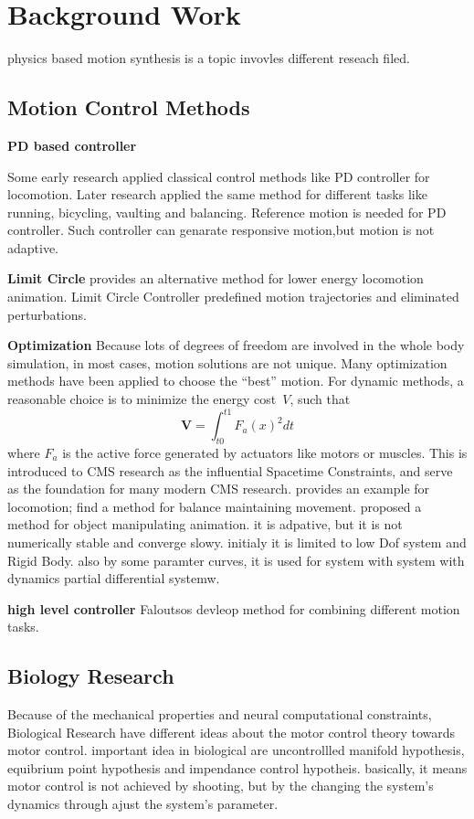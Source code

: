 \section{Background Work}
physics based motion synthesis is a topic invovles different reseach filed.
\subsection{Motion Control Methods}
\textbf{PD based controller}


Some early research applied classical control methods like PD controller \cite{Raibert1991} for locomotion. 
Later research \cite{Hodgins1995} applied the same method for different tasks like running, bicycling, vaulting and balancing.
Reference motion is needed for PD controller. 
Such controller can genarate responsive motion,but motion is not adaptive.

\textbf{Limit Circle}
\cite{Laszlo1996} provides an alternative method for lower energy locomotion animation. 
Limit Circle Controller predefined motion trajectories and eliminated perturbations. 



\textbf{Optimization}
Because lots of degrees of freedom are involved in the whole body simulation, in most cases, motion solutions are not unique.
Many optimization methods have been applied to choose the ``best'' motion. For dynamic methods, a reasonable choice is to minimize the energy cost~$V$, such that 
\[
\textbf{V}=\int_{t0}^{t1}F_{a}(x)^2dt
\]
where $F_{a}$ is the active force generated by actuators like motors or muscles. 
This is introduced to CMS research as the influential Spacetime Constraints\cite{Witkin1988}, and serve as the foundation for many modern CMS research. \cite{Jain2009} provides an example for locomotion;  \cite{BalanceControl} find a method for balance maintaining movement. \cite{Liu2009} proposed a method for object manipulating animation.
it is adpative, but it is not numerically stable and converge slowy. initialy it is limited to low Dof system and Rigid Body.
also by some paramter curves, it is used for system with system with dynamics partial differential systemw\cite{wu2003realistic}.



\textbf{high level controller}
Faloutsos\cite{faloutsos2001composable} devleop method for combining different motion tasks.




\subsection{Biology Research}
Because of the mechanical properties and neural computational constraints,
Biological Research have different ideas about the motor control theory towards motor control\cite{latash2008neurophysiological}.
important idea in biological are
uncontrollled manifold hypothesis,
equibrium point hypothesis
and impendance control hypotheis.
basically, it means motor control is not achieved by shooting, but by the changing the system's dynamics through ajust the system's parameter\cite{feldman1986ome}.



